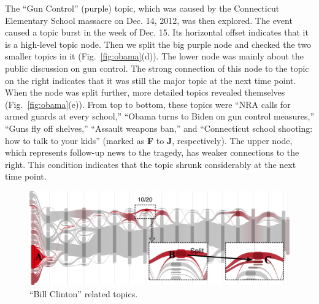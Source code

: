 The ``Gun Control'' (purple) topic, which was caused by the Connecticut Elementary School massacre on Dec. 14, 2012, was then explored.
The event caused a topic burst in the week of Dec. 15.
Its horizontal offset indicates that it is a high-level topic node.
Then we split the big purple node and checked the two smaller topics in it (Fig.~\ref{fig:obama}(d)).
The lower node was mainly about the public discussion on gun control.
The strong connection of this node to the topic on the right indicates that it was still the major topic at the next time point.
When the node was split further, more detailed topics revealed themselves (Fig.~\ref{fig:obama}(e)).
From top to bottom, these topics were ``NRA calls for armed guards at every school,'' ``Obama turns to Biden on gun control measures,'' ``Guns fly off shelves,'' ``Assault weapons ban,'' and ``Connecticut school shooting: how to talk to your kids'' (marked as \textbf{F} to \textbf{J}, respectively).
The upper node, which represents follow-up news to the tragedy, has weaker connections to the right.
This condition indicates that the topic shrunk considerably at the next time point.

\begin{figure}[t]
  \vspace{-2mm}
  \centering
  \includegraphics[width=\columnwidth]{fig/clintonoverview}
  \vspace{-5mm}
  \caption{``Bill Clinton'' related topics.}
  \label{fig:clintonoverview}

\end{figure}

